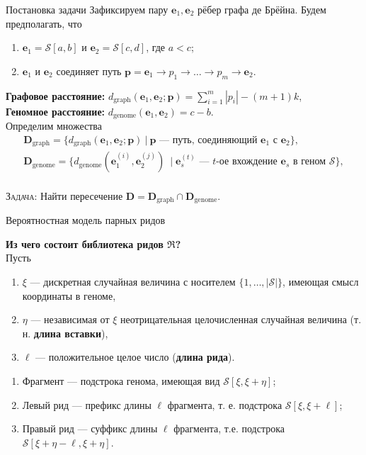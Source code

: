 \documentclass[unicode, notheorems]{beamer}
\begin{document}
\begin{frame}{Постановка задачи}
	Зафиксируем пару $\mathbf{e}_1, \mathbf{e}_2$ рёбер графа де Брёйна. Будем предполагать, что
	\begin{enumerate}
		\item  $\mathbf{e}_1 = \mathcal{S}[a, b]$ и $\mathbf{e}_2 = \mathcal{S}[c, d]$, где $a < c$;
		\item $\mathbf{e}_1$ и $\mathbf{e}_2$ соединяет путь $\bm p =  \mathbf{e}_1 \to p_1 \to \ldots \to p_m \to \mathbf{e}_2$.
	\end{enumerate}
	\bigskip
	{\bf Графовое расстояние:} $d_{\mathrm{graph}} (\mathbf{e}_1, \mathbf{e}_2; \bm p) = \sum_{i=1}^m |p_i| - (m+1)k$,\\
	\medskip
 	{\bf Геномное расстояние:} $d_{\mathrm{genome}}(\mathbf{e}_1, \mathbf{e}_2) = c - b$.\\
 	\bigskip
	Определим множества
	\begin{gather*}
		\mathbf{D}_{\mathrm{graph}} = \big\{ d_{\mathrm{graph}} (\mathbf{e}_1, \mathbf{e}_2; \bm p)\  |\  \bm p \text{ --- путь, соединяющий } \mathbf{e}_1 \text{ с } \mathbf{e}_2  \big\} , \\
		\mathbf{D}_{\mathrm{genome}} = \big\{  d_{\mathrm{genome}}(\mathbf{e}_1^{(i)}, \mathbf{e}_2^{(j)})\ \mid \mathbf{e}_s^{(t)} \text{ --- } t \text{-ое вхождение } \mathbf{e}_s \text{ в геном } \mathcal{S} \big\},
	\end{gather*}\\ 
	\textsc{ \large \color{blue} Задача:}
	Найти пересечение $\mathbf{D} = \mathbf{D}_{\mathrm{graph}} \cap \mathbf{D}_{\mathrm{genome}}$.
	\end{frame}

\begin{frame}{Вероятностная модель парных ридов}

{\color{blue} \bf Из чего состоит библиотека ридов $\mathfrak{R}$?}\\
\medskip
Пусть
\begin{enumerate}
	\item  $\xi$ --- дискретная случайная величина с носителем $\{ 1, \ldots, |\mathcal{S}|\}$, имеющая смысл координаты в геноме,
	\item $\eta$ --- независимая от $\xi$ неотрицательная целочисленная случайная величина (т. н. \textbf{длина вставки}),
	\item $\ell$ --- положительное целое число (\textbf{длина рида}).
\end{enumerate}
\begin{block}{}
	\begin{enumerate}
		\item Фрагмент --- подстрока генома, имеющая вид $\mathcal{S}[\xi, \xi+\eta]$;
		\item Левый рид --- префикс длины $\ell$ фрагмента, т. е. подстрока  $\mathcal{S}[\xi, \xi+\ell]$;
		\item Правый рид --- суффикс длины $\ell$ фрагмента, т.е. подстрока $\mathcal{S}[\xi+\eta-\ell, \xi+\eta]$.
	\end{enumerate}
\end{block}
\end{frame}
\end{document}
